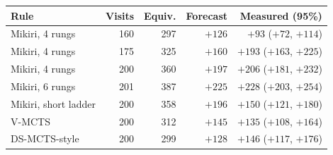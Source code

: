 \begin{tabular}{lrrrr}
\toprule
Rule & Visits & Equiv. & Forecast & Measured (95\%) \\
\midrule
Mikiri, 4 rungs & 160 & 297 & $+126$ & $+93$ ($+72$, $+114$) \\
Mikiri, 4 rungs & 175 & 325 & $+160$ & $+193$ ($+163$, $+225$) \\
Mikiri, 4 rungs & 200 & 360 & $+197$ & $+206$ ($+181$, $+232$) \\
Mikiri, 6 rungs & 201 & 387 & $+225$ & $+228$ ($+203$, $+254$) \\
Mikiri, short ladder & 200 & 358 & $+196$ & $+150$ ($+121$, $+180$) \\
V-MCTS & 200 & 312 & $+145$ & $+135$ ($+108$, $+164$) \\
DS-MCTS-style & 200 & 299 & $+128$ & $+146$ ($+117$, $+176$) \\
\bottomrule
\end{tabular}
